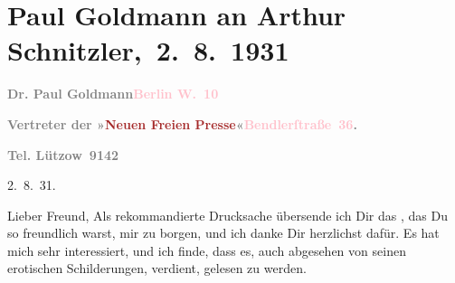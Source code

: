 

\renewcommand{\erwaehntePersonen}{Personen: Eva Marie Goldmann}
\renewcommand{\erwaehnteInstitutionen}{Institutionen: Neue Freie Presse}
\renewcommand{\erwaehnteOrte}{Orte: Bendlerstraße, Berlin, Velden am Wörthersee, Wien}
\renewcommand{\erwaehnteWerke}{Werke: ?? [Roman mit erotischen Schilderungen]}
\section[ Paul Goldmann an Arthur Schnitzler, 2. 8. 1931]{Paul Goldmann an Arthur Schnitzler, 2. 8. 1931}
\nopagebreak{}
\rehead{ }\normalsize\beginnumbering{}
\toendnotes[C]{\smallbreak\pagebreak[2]}
\toendnotes[C]{\smallbreak}
\pstart
           \noindent{}{\pb}\textcolor{gray}{\textbf{Dr. Paul Goldmann}}\hfill \textcolor{gray}{\textbf{\textcolor{pink}{Berlin W. 10}{}\ledrightnote{\textcolor{pink}{Berlin}}}}\pend
           
\pstart
           \textcolor{gray}{\textbf{Vertreter der »\textcolor{brown}{Neuen Freien
                           Presse}{}\ledrightnote{\textcolor{brown}{Neue Freie Presse}}«}}\hfill \textcolor{gray}{\textbf{\textcolor{pink}{Bendlerſtraße 36}{}\ledrightnote{\textcolor{pink}{Bendlerstraße}}.}}\pend
           
\pstart
           \raggedleft{}\textcolor{gray}{\textbf{Tel. Lützow 9142}}\pend
           
\pstart
           \raggedleft{}2. 8. 31.\pend
           
\pstart\center{}Lieber Freund,\pend
\pstart
           Als rekommandierte Drucksache übersende ich Dir das \label{K_L03518-1v}\label{K_L03518-1h}, das Du so freundlich warst, mir zu borgen, und ich danke Dir herzlich\introOben{}st\introOben{} dafür. Es hat mich sehr interessiert, und ich finde, dass
               es, auch abgesehen von seinen erotischen Schilderungen, verdient, gelesen zu
               werden.\pend
           

